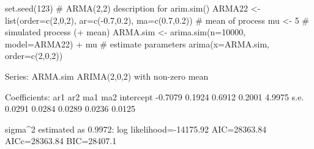 \begin{Schunk}
\begin{Sinput}
 set.seed(123)
 # ARMA(2,2) description for arim.sim()
 ARMA22 <- list(order=c(2,0,2), ar=c(-0.7,0.2), ma=c(0.7,0.2))
 # mean of process
 mu <- 5
 # simulated process (+ mean)
 ARMA.sim <- arima.sim(n=10000, model=ARMA22) + mu
 # estimate parameters
 arima(x=ARMA.sim, order=c(2,0,2))
\end{Sinput}
\begin{Soutput}
Series: ARMA.sim 
ARIMA(2,0,2) with non-zero mean 

Coefficients:
          ar1     ar2     ma1     ma2  intercept
      -0.7079  0.1924  0.6912  0.2001     4.9975
s.e.   0.0291  0.0284  0.0289  0.0236     0.0125

sigma^2 estimated as 0.9972:  log likelihood=-14175.92
AIC=28363.84   AICc=28363.84   BIC=28407.1
\end{Soutput}
\end{Schunk}

